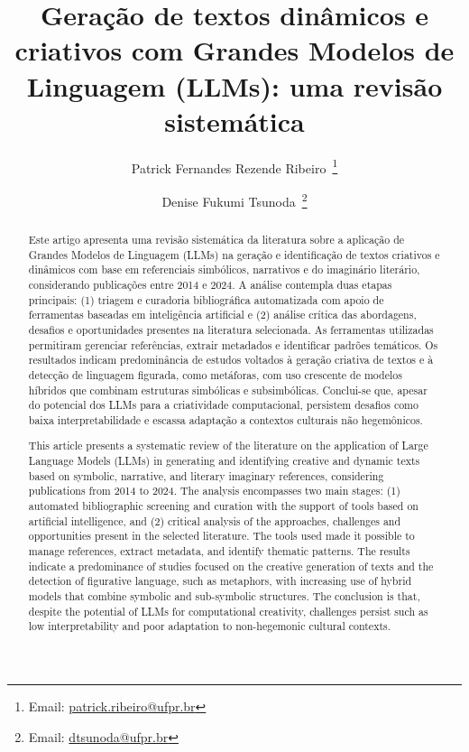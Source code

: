 \documentclass[portuguese]{textolivre}
\title{Geração de textos dinâmicos e criativos com Grandes Modelos de Linguagem (LLMs): uma revisão sistemática}
\author[1]{Patrick Fernandes Rezende Ribeiro~\orcid{0000-0002-5973-1110}\thanks{Email: \href{mailto:patrick.ribeiro@ufpr.br}{patrick.ribeiro@ufpr.br}}}
\author[1]{Denise Fukumi Tsunoda~\orcid{0000-0002-5663-4534}\thanks{Email: \href{mailto:dtsunoda@ufpr.br}{dtsunoda@ufpr.br}}}
\affil[1]{Universidade Federal do Paraná, Programa de Pós-Graduação em Gestão da Informação, Departamento de Ciência e Gestão da Informação, Curitiba, PR, Brasil.}
\begin{document}
\maketitle

\begin{polyabstract}
\begin{abstract}
Este artigo apresenta uma revisão sistemática da literatura sobre a aplicação de Grandes Modelos de Linguagem (LLMs) na geração e identificação de textos criativos e dinâmicos com base em referenciais simbólicos, narrativos e do imaginário literário, considerando publicações entre 2014 e 2024. A análise contempla duas etapas principais: (1) triagem e curadoria bibliográfica automatizada com apoio de ferramentas baseadas em inteligência artificial e (2) análise crítica das abordagens, desafios e oportunidades presentes na literatura selecionada. As ferramentas utilizadas permitiram gerenciar referências, extrair metadados e identificar padrões temáticos. Os resultados indicam predominância de estudos voltados à geração criativa de textos e à detecção de linguagem figurada, como metáforas, com uso crescente de modelos híbridos que combinam estruturas simbólicas e subsimbólicas. Conclui-se que, apesar do potencial dos LLMs para a criatividade computacional, persistem desafios como baixa interpretabilidade e escassa adaptação a contextos culturais não hegemônicos.

\end{abstract}

\begin{english}
\begin{abstract}
This article presents a systematic review of the literature on the application of Large Language Models (LLMs) in generating and identifying creative and dynamic texts based on symbolic, narrative, and literary imaginary references, considering publications from 2014 to 2024. The analysis encompasses two main stages: (1) automated bibliographic screening and curation with the support of tools based on artificial intelligence, and (2) critical analysis of the approaches, challenges and opportunities present in the selected literature. The tools used made it possible to manage references, extract metadata, and identify thematic patterns. The results indicate a predominance of studies focused on the creative generation of texts and the detection of figurative language, such as metaphors, with increasing use of hybrid models that combine symbolic and sub-symbolic structures. The conclusion is that, despite the potential of LLMs for computational creativity, challenges persist such as low interpretability and poor adaptation to non-hegemonic cultural contexts.


\end{abstract}
\end{english}
\end{polyabstract}
\end{document}
